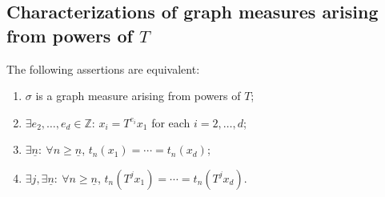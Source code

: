 \documentclass[AHL,Unicode,longabstracts]{cedram}
\newcommand{\ZZ}{\mathbb{Z}}
\newcommand{\nb}{\underline{n}}
\let\oldexists\exists
\renewcommand*{\exists}{\mathrel{\oldexists}}
\let\oldforall\forall
\renewcommand*{\forall}{\mathrel{\oldforall}}
\begin{document}
\subsection{Characterizations of graph measures arising from powers of \texorpdfstring{$T$}{T}}\label{sec:graph}

\begin{lemm}\label{lemma:graph}
The following assertions are equivalent:
\begin{enumerate}%
\item \label{3.13.1} $\sigma$ is a graph measure arising from powers of $T$;
\item \label{3.13.2} $\exists e_2,\ldots,e_d\in\ZZ$: $x_i=T^{e_i}x_1$ for each $i=2,\ldots,d$;
\item \label{3.13.3} $\exists\nb:\ \forall n\ge\nb$, $t_n(x_1)=\cdots=t_n(x_d)$;
\item \label{3.13.4} $\exists j,\exists\nb:\ \forall n\ge\nb$, $t_n(T^jx_1)=\cdots=t_n(T^jx_d)$.
\end{enumerate}
\end{lemm}
\end{document}
